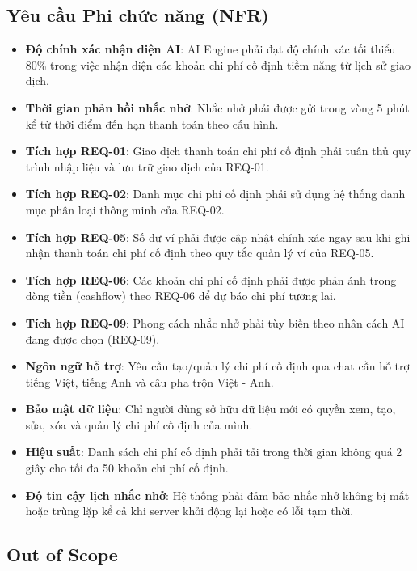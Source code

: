 \subsection{Yêu cầu Phi chức năng (NFR)}

\begin{itemize}
\item \textbf{Độ chính xác nhận diện AI}: AI Engine phải đạt độ chính xác tối thiểu 80\% trong việc nhận diện các khoản chi phí cố định tiềm năng từ lịch sử giao dịch.
\item \textbf{Thời gian phản hồi nhắc nhở}: Nhắc nhở phải được gửi trong vòng 5 phút kể từ thời điểm đến hạn thanh toán theo cấu hình.
\item \textbf{Tích hợp REQ-01}: Giao dịch thanh toán chi phí cố định phải tuân thủ quy trình nhập liệu và lưu trữ giao dịch của REQ-01.
\item \textbf{Tích hợp REQ-02}: Danh mục chi phí cố định phải sử dụng hệ thống danh mục phân loại thông minh của REQ-02.
\item \textbf{Tích hợp REQ-05}: Số dư ví phải được cập nhật chính xác ngay sau khi ghi nhận thanh toán chi phí cố định theo quy tắc quản lý ví của REQ-05.
\item \textbf{Tích hợp REQ-06}: Các khoản chi phí cố định phải được phản ánh trong dòng tiền (cashflow) theo REQ-06 để dự báo chi phí tương lai.
\item \textbf{Tích hợp REQ-09}: Phong cách nhắc nhở phải tùy biến theo nhân cách AI đang được chọn (REQ-09).
\item \textbf{Ngôn ngữ hỗ trợ}: Yêu cầu tạo/quản lý chi phí cố định qua chat cần hỗ trợ tiếng Việt, tiếng Anh và câu pha trộn Việt - Anh.
\item \textbf{Bảo mật dữ liệu}: Chỉ người dùng sở hữu dữ liệu mới có quyền xem, tạo, sửa, xóa và quản lý chi phí cố định của mình.
\item \textbf{Hiệu suất}: Danh sách chi phí cố định phải tải trong thời gian không quá 2 giây cho tối đa 50 khoản chi phí cố định.
\item \textbf{Độ tin cậy lịch nhắc nhở}: Hệ thống phải đảm bảo nhắc nhở không bị mất hoặc trùng lặp kể cả khi server khởi động lại hoặc có lỗi tạm thời.
\end{itemize}
\subsection{Out of Scope}

